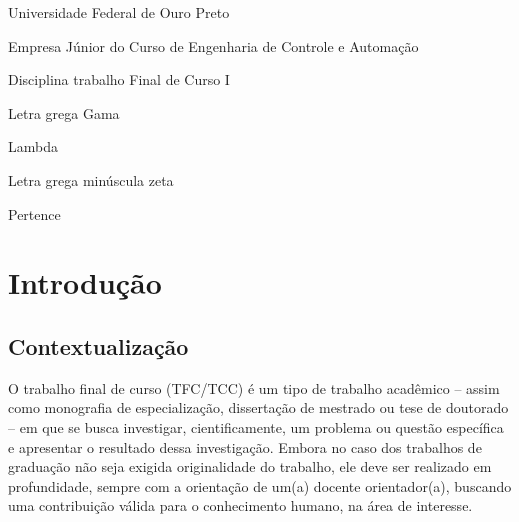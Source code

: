 \documentclass[
	12pt,				%
	openright,			%
	oneside,			%
	a4paper,			%
	english,			%
	brazil				%
	]{abntex2}
\begin{document}
\begin{siglas}
  \item[UFOP] Universidade Federal de Ouro Preto
  \item[Automic Jr] Empresa Júnior do Curso de Engenharia de Controle e Automação
  \item[CAT490] Disciplina trabalho Final de Curso I
\end{siglas}

\begin{simbolos}
  \item[$ \Gamma $] Letra grega Gama
  \item[$ \Lambda $] Lambda
  \item[$ \zeta $] Letra grega minúscula zeta
  \item[$ \in $] Pertence
\end{simbolos}

\tableofcontents*
\cleardoublepage


\makeatletter
{}
\makeatother

\textual


\pagestyle{plain}


\chapter[Introdução]{Introdução} %

\section{Contextualização}
	O trabalho final de curso (TFC/TCC) é um tipo de trabalho acadêmico -- assim como monografia de especialização, dissertação de mestrado ou tese de doutorado -- em que se busca investigar, cientificamente, um problema ou questão específica e apresentar o resultado dessa investigação. Embora no caso dos trabalhos de graduação não seja exigida originalidade do trabalho, ele deve ser realizado em profundidade, sempre com a orientação de um(a) docente orientador(a), buscando uma contribuição válida para o conhecimento humano, na área de interesse. 
	
\end{document}
